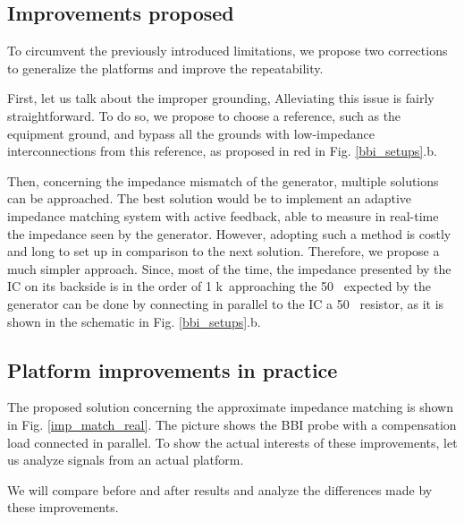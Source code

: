 	\subsection{Improvements proposed}
		To circumvent the previously introduced limitations, we propose two corrections to generalize the platforms and improve the repeatability.
		
		First, let us talk about the improper grounding,
		Alleviating this issue is fairly straightforward.
		To do so, we propose to choose a reference, such as the equipment ground, and bypass all the grounds with low-impedance interconnections from this reference, as proposed in red in Fig. \ref{bbi_setups}.b.
		
		Then, concerning the impedance mismatch of the generator, multiple solutions can be approached.
		The best solution would be to implement an adaptive impedance matching system with active feedback, able to measure in real-time the impedance seen by the generator.
		However, adopting such a method is costly and long to set up in comparison to the next solution.
		Therefore, we propose a much simpler approach.
		Since, most of the time, the impedance presented by the IC on its backside is in the order of 1 k\textOmega\, approaching the 50 \textOmega\ expected by the generator can be done by connecting in parallel to the IC a 50 \textOmega\ resistor, as it is shown in the schematic in Fig. \ref{bbi_setups}.b.
		
	\subsection{Platform improvements in practice}
		
		The proposed solution concerning the approximate impedance matching is shown in Fig. \ref{imp_match_real}.
		The picture shows the BBI probe with a compensation load connected in parallel.
		To show the actual interests of these improvements, let us analyze signals from an actual platform.
		
		We will compare before and after results and analyze the differences made by these improvements.
	
